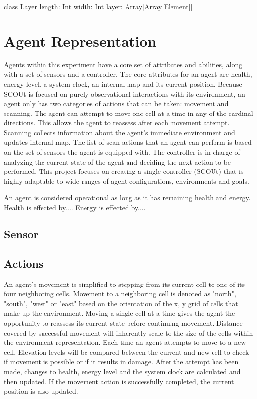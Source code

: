 class Layer {
	length: Int
	width: Int
	layer: Array[Array[Element]]
}



\section{Agent Representation}
Agents within this experiment have a core set of attributes and abilities, along with a set of sensors and a controller.
The core attributes for an agent are health, energy level, a system clock, an internal map and its current position.
Because SCOUt is focused on purely observational interactions with its environment, an agent only has two categories of actions that can be taken: movement and scanning.
The agent can attempt to move one cell at a time in any of the cardinal directions.
This allows the agent to reassess after each movement attempt.
Scanning collects information about the agent's immediate environment and updates internal map.
The list of scan actions that an agent can perform is based on the set of sensors the agent is equipped with.
The controller is in charge of analyzing the current state of the agent and deciding the next action to be performed.
This project focuses on creating a single controller (SCOUt) that is highly adaptable to wide ranges of agent configurations, environments and goals.

An agent is considered operational as long as it has remaining health and energy.
Health is effected by....
Energy is effected by....


\subsection{Sensor}


\subsection{Actions}
An agent's movement is simplified to stepping from its current cell to one of its four neighboring cells.
Movement to a neighboring cell is denoted as "north", "south", "west" or "east" based on the orientation of the x, y grid of cells that make up the environment.
Moving a single cell at a time gives the agent the opportunity to reassess its current state before continuing movement.
Distance covered by successful movement will inherently scale to the size of the cells within the environment representation.
Each time an agent attempts to move to a new cell, Elevation levels will be compared between the current and new cell to check if movement is possible or if it results in damage.
After the attempt has been made, changes to health, energy level and the system clock are calculated and then updated.
If the movement action is successfully completed, the current position is also updated.

